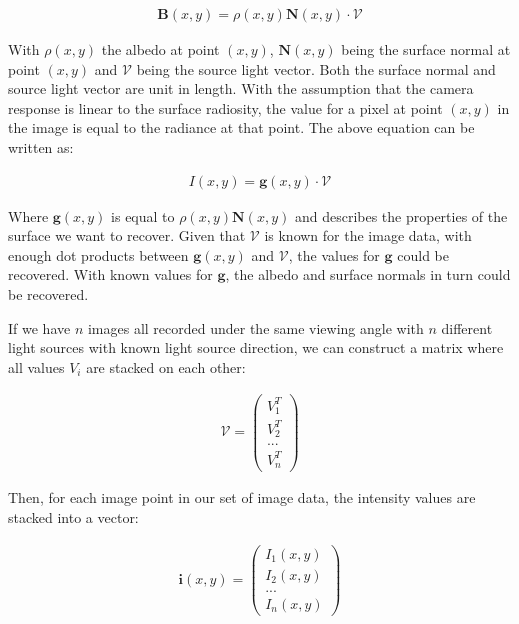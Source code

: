 	\begin{eqnarray*}
		\textbf{B}(x,y) = \rho(x,y)\textbf{N}(x,y) \cdot \mathcal{V}
	\end{eqnarray*}

\noindent With $\rho(x,y)$ the albedo at point $(x,y)$, $\textbf{N}(x,y)$ being the surface normal at point $(x,y)$ and $\mathcal{V}$ being the source light vector. Both the surface normal and source light vector are unit in length. With the assumption that the camera response is linear to the surface radiosity, the value for a pixel at point $(x,y)$ in the image is equal to the radiance at that point. The above equation can be written as:

	\begin{eqnarray*}
		I(x,y) =  \textbf{g}(x,y) \cdot \mathcal{V}
	\end{eqnarray*}

\noindent Where $\textbf{g}(x,y)$ is equal to $\rho(x,y)\textbf{N}(x,y)$ and describes the properties of the surface we want to recover. Given that $\mathcal{V}$ is known for the image data, with enough dot products between $\textbf{g}(x,y)$ and $\mathcal{V}$, the values for $\textbf{g}$ could be recovered. With known values for $\textbf{g}$, the albedo and surface normals in turn could be recovered.

If we have $n$ images all recorded under the same viewing angle with $n$ different light sources with known light source direction, we can construct a matrix where all values $V_i$ are stacked on each other:

	\begin{eqnarray*}
		\mathcal{V} = \begin{pmatrix} V_1^T \\ V_2^T \\ ... \\ V_n^T \end{pmatrix}
	\end{eqnarray*}

\noindent Then, for each image point in our set of image data, the intensity values are stacked into a vector:

	\begin{eqnarray*}
		\textbf{i}(x,y) = \begin{pmatrix} I_1(x,y) \\ I_2(x,y) \\ ... \\ I_n(x,y) \end{pmatrix}
	\end{eqnarray*}

